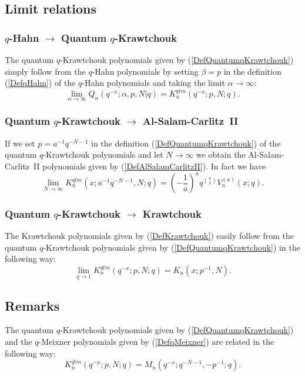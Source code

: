 \documentclass[envcountchap,graybox]{svmono}
\newcounter{rom}
\begin{document}
\subsection*{Limit relations}

\subsubsection*{$q$-Hahn $\rightarrow$ Quantum $q$-Krawtchouk}
The quantum $q$-Krawtchouk polynomials given by (\ref{DefQuantumqKrawtchouk})
simply follow from the $q$-Hahn polynomials by setting $\beta=p$ in the definition (\ref{DefqHahn}) of
the $q$-Hahn polynomials and taking the limit $\alpha\rightarrow\infty$:
$$\lim_{\alpha\rightarrow\infty}Q_n(q^{-x};\alpha,p,N|q)=K_n^{qtm}(q^{-x};p,N;q).$$

\subsubsection*{Quantum $q$-Krawtchouk $\rightarrow$ Al-Salam-Carlitz~II}
If we set $p=a^{-1}q^{-N-1}$ in the definition (\ref{DefQuantumqKrawtchouk})
of the quantum $q$-Krawtchouk polynomials and let $N\rightarrow\infty$ we
obtain the Al-Salam-Carlitz~II polynomials given by
(\ref{DefAlSalamCarlitzII}). In fact we have
\begin{equation}
\lim_{N\rightarrow\infty}K_n^{qtm}(x;a^{-1}q^{-N-1},N;q)=
\left(-\frac{1}{a}\right)^nq^{\binom{n}{2}}V_n^{(a)}(x;q).
\end{equation}

\subsubsection*{Quantum $q$-Krawtchouk $\rightarrow$ Krawtchouk}
The Krawtchouk polynomials given by (\ref{DefKrawtchouk}) easily follow from
the quantum $q$-Krawtchouk polynomials given by (\ref{DefQuantumqKrawtchouk})
in the following way:
\begin{equation}
\lim_{q\rightarrow 1}K_n^{qtm}(q^{-x};p,N;q)=K_n(x;p^{-1},N).
\end{equation}

\subsection*{Remarks}
The quantum $q$-Krawtchouk polynomials given by
(\ref{DefQuantumqKrawtchouk}) and the $q$-Meixner polynomials given by
(\ref{DefqMeixner}) are related in the following way:
$$K_n^{qtm}(q^{-x};p,N;q)=M_n(q^{-x};q^{-N-1},-p^{-1};q).$$
\end{document}
